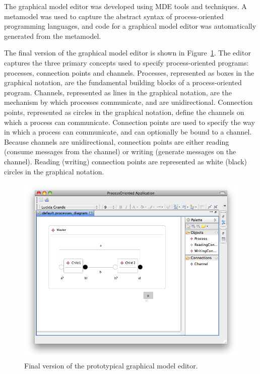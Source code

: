 The graphical model editor was developed using MDE tools and techniques. A metamodel was used to capture the abstract syntax of process-oriented programming languages, and code for a graphical model editor was automatically generated from the metamodel. 

The final version of the graphical model editor is shown in Figure~\ref{fig:po_final_graphical_editor}. The editor captures the three primary concepts used to specify process-oriented programs: processes, connection points and channels. Processes, represented as boxes in the graphical notation, are the fundamental building blocks of a process-oriented program. Channels, represented as lines in the graphical notation, are the mechanism by which processes communicate, and are unidirectional. Connection points, represented as circles in the graphical notation, define the channels on which a process can communicate. Connection points are used to specify the way in which a process can communicate, and can optionally be bound to a channel. Because channels are unidirectional, connection points are either reading (consume messages from the channel) or writing (generate messages on the channel). Reading (writing) connection points are represented as white (black) circles in the graphical notation.  

\begin{figure}[htbp]
	\centering
	\includegraphics[width=13.5cm]{6.Evaluation/images/user_driven/po_final_editor.png}
	\caption{Final version of the prototypical graphical model editor.}
	\label{fig:po_final_graphical_editor}
\end{figure}

